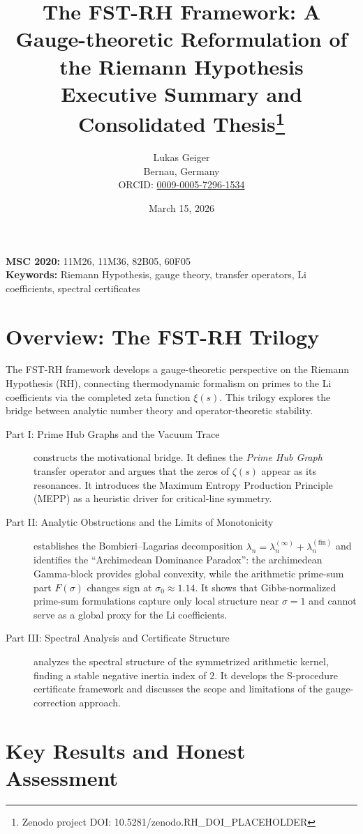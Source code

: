 \documentclass[12pt,a4paper]{article}
\title{The FST-RH Framework: A Gauge-theoretic Reformulation of the Riemann Hypothesis\\ \large Executive Summary and Consolidated Thesis\thanks{Zenodo project DOI: 10.5281/zenodo.RH\_DOI\_PLACEHOLDER}}
\author{Lukas Geiger\\
\small Bernau, Germany\\
\small ORCID: \href{https://orcid.org/0009-0005-7296-1534}{0009-0005-7296-1534}}
\date{March 15, 2026}
\begin{document}
\maketitle

\noindent\textbf{MSC 2020:} 11M26, 11M36, 82B05, 60F05\\
\textbf{Keywords:} Riemann Hypothesis, gauge theory, transfer operators, Li coefficients, spectral certificates

\section{Overview: The FST-RH Trilogy}

The FST-RH framework develops a gauge-theoretic perspective on the Riemann Hypothesis (RH), connecting thermodynamic formalism on primes to the Li coefficients via the completed zeta function $\xi(s)$. This trilogy explores the bridge between analytic number theory and operator-theoretic stability.

\begin{description}
    \item[Part I: Prime Hub Graphs and the Vacuum Trace] constructs the motivational bridge. It defines the \emph{Prime Hub Graph} transfer operator and argues that the zeros of $\zeta(s)$ appear as its resonances. It introduces the Maximum Entropy Production Principle (MEPP) as a heuristic driver for critical-line symmetry.
    \item[Part II: Analytic Obstructions and the Limits of Monotonicity] establishes the Bombieri--Lagarias decomposition $\lambda_n = \lambda_n^{(\infty)} + \lambda_n^{(\mathrm{fin})}$ and identifies the ``Archimedean Dominance Paradox'': the archimedean Gamma-block provides global convexity, while the arithmetic prime-sum part $F(\sigma)$ changes sign at $\sigma_0 \approx 1.14$. It shows that Gibbs-normalized prime-sum formulations capture only local structure near $\sigma = 1$ and cannot serve as a global proxy for the Li coefficients.
    \item[Part III: Spectral Analysis and Certificate Structure] analyzes the spectral structure of the symmetrized arithmetic kernel, finding a stable negative inertia index of $2$. It develops the S-procedure certificate framework and discusses the scope and limitations of the gauge-correction approach.
\end{description}

\section{Key Results and Honest Assessment}
\end{document}
